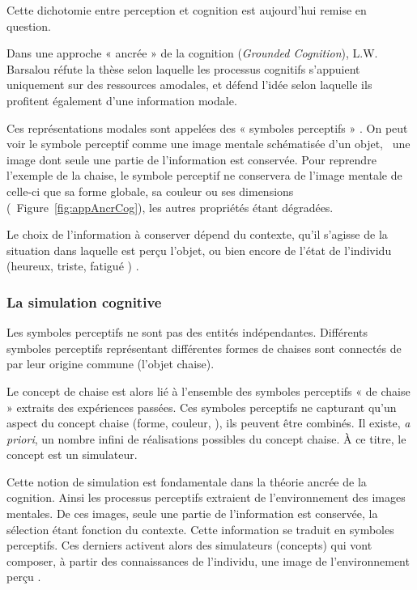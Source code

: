 Cette dichotomie entre perception et cognition est aujourd'hui remise en question. 

Dans une approche « ancrée » de la cognition (\emph{Grounded Cognition}), L.W. Barsalou réfute la thèse selon laquelle les processus cognitifs s'appuient uniquement sur des ressources amodales, et défend l'idée selon laquelle ils profitent également d'une information modale.

Ces représentations modales sont appelées des « symboles perceptifs » \citep{barsalou1999perceptions}. On peut voir le symbole perceptif comme une image mentale schématisée d'un objet, \ie~une image dont seule une partie de l'information est conservée. Pour reprendre l'exemple de la chaise, le symbole perceptif ne conservera de l'image mentale de celle-ci que sa forme globale, sa couleur ou ses dimensions (\cf~Figure~\ref{fig:appAncrCog}), les autres propriétés étant dégradées. 

Le choix de l'information à conserver dépend du contexte, qu'il s'agisse de la situation dans laquelle est perçu l'objet, ou bien encore de l'état de l'individu (heureux, triste, fatigué \etc) \citep{barsalou2003situated}.

\subsubsection{La simulation cognitive}

Les symboles perceptifs ne sont pas des entités indépendantes. Différents symboles perceptifs représentant différentes formes de chaises sont connectés de par leur origine commune (l'objet chaise).
 
Le concept de chaise est alors lié à l'ensemble des symboles perceptifs « de chaise » extraits des expériences passées. Ces symboles perceptifs ne capturant qu'un aspect du concept chaise (forme, couleur, \etc), ils peuvent être combinés. Il existe, \emph{a priori}, un nombre infini de réalisations possibles du concept chaise. À ce titre, le concept est un simulateur.

Cette notion de simulation est fondamentale dans la théorie ancrée de la cognition. Ainsi les processus perceptifs extraient de l'environnement des images mentales. De ces images, seule une partie de l'information est conservée, la sélection étant fonction du contexte. Cette information se traduit en symboles perceptifs. Ces derniers activent alors des simulateurs (concepts) qui vont composer, à partir des connaissances de l'individu, une image de l'environnement perçu \citep{barsalou2003situated}.

